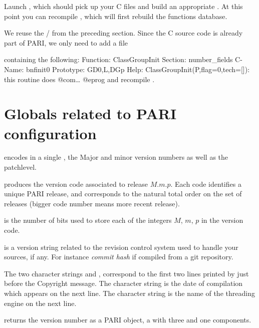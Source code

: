 \item Launch , which should pick up your C files and build an
appropriate . At this point you can recompile , which
will first rebuild the functions database.

 We reuse the  / 
from the preceding section. Since the C source code is already part
of PARI, we only need to add a file


\noindent containing the following:
\bprog
Function: ClassGroupInit
Section: number_fields
C-Name: bnfinit0
Prototype: GD0,L,DGp
Help: ClassGroupInit(P,{flag=0},{tech=[]}): this routine does @com\dots
@eprog\noindent
and recompile .

\section{Globals related to PARI configuration}

\noindent {} encodes in a single , the Major
and minor version numbers as well as the patchlevel.

 produces the version code
associated to release $M.m.p$. Each code identifies a unique PARI release,
and corresponds to the natural total order on the set of releases (bigger
code number means more recent release).

\noindent {} is the number of bits used to store each of
the integers $M$, $m$, $p$ in the version code.

\noindent {} is a version string related to the
revision control system used to handle your sources, if any. For instance
\emph{commit hash} if compiled from a git repository.

The two character strings  and ,
correspond to the first two lines printed by  just before the
Copyright message. The character string  is the
date of compilation which appears on the next line. The character string
 is the name of the threading engine on the next line.

 returns the version number as a PARI object, a
 with three  and one  components.

